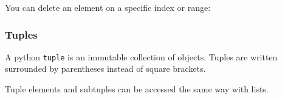 You can delete an element on a specific index or range:

\begin{Shaded}
\begin{Highlighting}[]
\NormalTok{ l[}\NormalTok{]}
\end{Highlighting}
\end{Shaded}

\begin{Shaded}
\begin{Highlighting}[]
\NormalTok{[}\NormalTok{, }\NormalTok{, }\StringTok{\textquotesingle{}4\textquotesingle{}}\NormalTok{, }\NormalTok{, []]}
\end{Highlighting}
\end{Shaded}

\begin{Shaded}
\begin{Highlighting}[]
\NormalTok{ l[}\NormalTok{:}\NormalTok{]}
\end{Highlighting}
\end{Shaded}

\begin{Shaded}
\begin{Highlighting}[]
\NormalTok{[}\NormalTok{, }\NormalTok{, []]}
\end{Highlighting}
\end{Shaded}

\subsubsection{Tuples}\label{python-introduction.md__tuples}

A python \texttt{tuple} is an immutable collection of objects. Tuples
are written surrounded by parentheses instead of square brackets.

\begin{Shaded}
\begin{Highlighting}[]
\OperatorTok{=}\NormalTok{ (}\NormalTok{,}\NormalTok{,}\NormalTok{,}\NormalTok{,}\NormalTok{)}
\end{Highlighting}
\end{Shaded}

Tuple elements and subtuples can be accessed the same way with lists.

\begin{Shaded}
\begin{Highlighting}[]
\NormalTok{t[}\NormalTok{]}
\end{Highlighting}
\end{Shaded}

